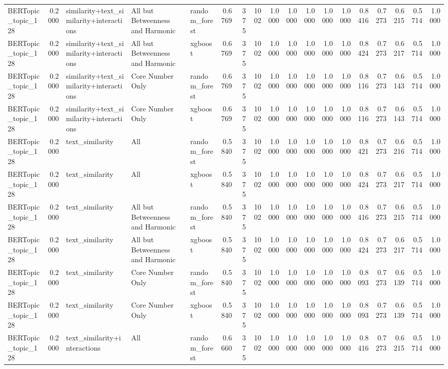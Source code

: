 \begin{tabular}{lrlllrrrrrrrrrrrrr}
BERTopic_topic_128 & 0.2000 & similarity+text_similarity+interactions & All but Betweenness and Harmonic & random_forest & 0.6769 & 375 & 1002 & 1.0000 & 1.0000 & 1.0000 & 1.0000 & 1.0000 & 0.8416 & 0.7273 & 0.6215 & 0.5714 & 1.0000 \\
BERTopic_topic_128 & 0.2000 & similarity+text_similarity+interactions & All but Betweenness and Harmonic & xgboost & 0.6769 & 375 & 1002 & 1.0000 & 1.0000 & 1.0000 & 1.0000 & 1.0000 & 0.8424 & 0.7273 & 0.6217 & 0.5714 & 1.0000 \\
BERTopic_topic_128 & 0.2000 & similarity+text_similarity+interactions & Core Number Only & random_forest & 0.6769 & 375 & 1002 & 1.0000 & 1.0000 & 1.0000 & 1.0000 & 1.0000 & 0.8116 & 0.7273 & 0.6143 & 0.5714 & 1.0000 \\
BERTopic_topic_128 & 0.2000 & similarity+text_similarity+interactions & Core Number Only & xgboost & 0.6769 & 375 & 1002 & 1.0000 & 1.0000 & 1.0000 & 1.0000 & 1.0000 & 0.8116 & 0.7273 & 0.6143 & 0.5714 & 1.0000 \\
BERTopic_topic_128 & 0.2000 & text_similarity & All & random_forest & 0.5840 & 375 & 1002 & 1.0000 & 1.0000 & 1.0000 & 1.0000 & 1.0000 & 0.8421 & 0.7273 & 0.6216 & 0.5714 & 1.0000 \\
BERTopic_topic_128 & 0.2000 & text_similarity & All & xgboost & 0.5840 & 375 & 1002 & 1.0000 & 1.0000 & 1.0000 & 1.0000 & 1.0000 & 0.8424 & 0.7273 & 0.6217 & 0.5714 & 1.0000 \\
BERTopic_topic_128 & 0.2000 & text_similarity & All but Betweenness and Harmonic & random_forest & 0.5840 & 375 & 1002 & 1.0000 & 1.0000 & 1.0000 & 1.0000 & 1.0000 & 0.8416 & 0.7273 & 0.6215 & 0.5714 & 1.0000 \\
BERTopic_topic_128 & 0.2000 & text_similarity & All but Betweenness and Harmonic & xgboost & 0.5840 & 375 & 1002 & 1.0000 & 1.0000 & 1.0000 & 1.0000 & 1.0000 & 0.8424 & 0.7273 & 0.6217 & 0.5714 & 1.0000 \\
BERTopic_topic_128 & 0.2000 & text_similarity & Core Number Only & random_forest & 0.5840 & 375 & 1002 & 1.0000 & 1.0000 & 1.0000 & 1.0000 & 1.0000 & 0.8093 & 0.7273 & 0.6139 & 0.5714 & 1.0000 \\
BERTopic_topic_128 & 0.2000 & text_similarity & Core Number Only & xgboost & 0.5840 & 375 & 1002 & 1.0000 & 1.0000 & 1.0000 & 1.0000 & 1.0000 & 0.8093 & 0.7273 & 0.6139 & 0.5714 & 1.0000 \\
BERTopic_topic_128 & 0.2000 & text_similarity+interactions & All & random_forest & 0.6660 & 375 & 1002 & 1.0000 & 1.0000 & 1.0000 & 1.0000 & 1.0000 & 0.8416 & 0.7273 & 0.6215 & 0.5714 & 1.0000 \\

\end{tabular}
